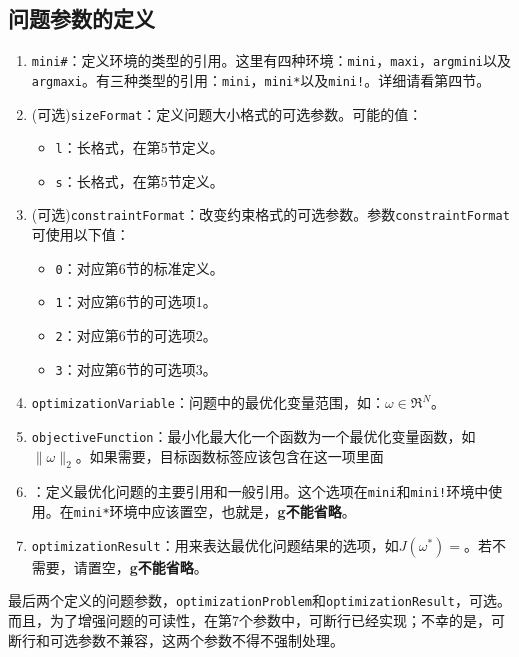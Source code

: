 \documentclass[UTF8]{ctexart}
\begin{document}
\subsection{问题参数的定义}
\begin{enumerate}
\item \texttt{mini#}：定义环境的类型的引用。这里有四种环境：\texttt{mini}，\texttt{maxi}，\texttt{argmini}以及\texttt{argmaxi}。有三种类型的引用：\texttt{mini}，\texttt{mini*}以及\texttt{mini!}。详细请看第四节。
\item (可选)\texttt{sizeFormat}：定义问题大小格式的可选参数。可能的值：
\begin{itemize}
\item \texttt{l}：长格式，在第5节定义。
\item \texttt{s}：长格式，在第5节定义。
\end{itemize}
\item (可选)\texttt{constraintFormat}：改变约束格式的可选参数。参数\texttt{constraintFormat}可使用以下值：
\begin{itemize}
\item \texttt{0}：对应第6节的标准定义。
\item \texttt{1}：对应第6节的可选项1。
\item \texttt{2}：对应第6节的可选项2。
\item \texttt{3}：对应第6节的可选项3。
\end{itemize}
\item \texttt{optimizationVariable}：问题中的最优化变量范围，如：$\omega\in\mathfrak{R}^N$。
\item \texttt{objectiveFunction\label{objective}}：最小化\/最大化一个函数为一个最优化变量函数，如$\|\omega\|_2$。如果需要，目标函数标签应该包含在这一项里面
\item \texttt{\label{optimizationProblem}}：定义最优化问题的主要引用和一般引用。这个选项在\texttt{mini}和\texttt{mini!}环境中使用。在\texttt{mini*}环境中应该置空，也就是\texttt{{}}，\textbf{g不能省略}。
\item \texttt{optimizationResult}：用来表达最优化问题结果的选项，如$J(\omega^*)=$。若不需要，请置空，\textbf{g不能省略}。
\end{enumerate}

最后两个定义的问题参数，\texttt{optimizationProblem}和\texttt{optimizationResult}，可选。而且，为了增强问题的可读性，在第7个参数中，可断行已经实现；不幸的是，可断行和可选参数不兼容，这两个参数不得不强制处理。
\end{document}
